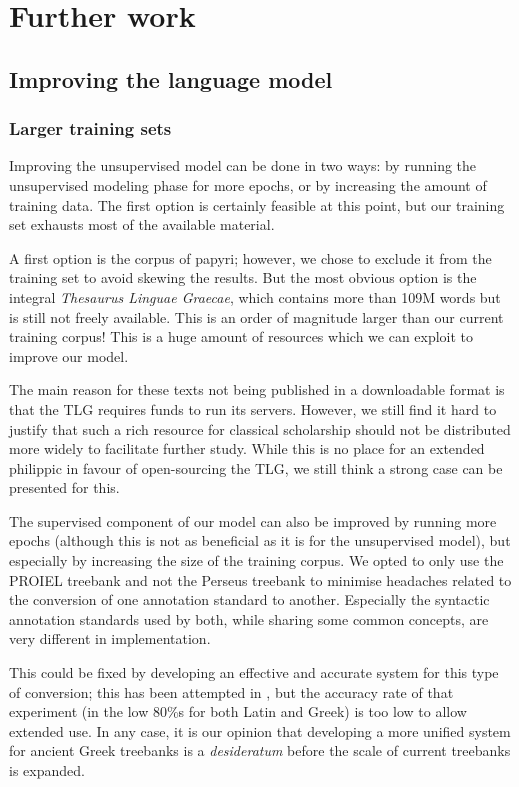 \section{Further work}
\label{sec:further_work}
\subsection{Improving the language model}
\subsubsection{Larger training sets}
Improving the unsupervised model can be done in two ways: by running
the unsupervised modeling phase for more epochs, or by increasing the
amount of training data. The first option is certainly feasible at
this point, but our training set exhausts most of the available
material. 

A first option is the corpus of papyri; however, we chose to exclude
it from the training set to avoid skewing the results. But the most
obvious option is the integral \textit{Thesaurus Linguae Graecae},
which contains more than 109M words but is still not freely
available. This is an order of magnitude larger than our current
training corpus! This is a huge amount of resources which we can
exploit to improve our model.

The main reason for these texts not being published in a downloadable
format is that the TLG requires funds to run its servers. However, we
still find it hard to justify that such a rich resource for classical
scholarship should not be distributed more widely to facilitate
further study. While this is no place for an extended philippic in
favour of open-sourcing the TLG, we still think a strong case can be
presented for this.

The supervised component of our model can also be improved by running
more epochs (although this is not as beneficial as it is for the
unsupervised model), but especially by increasing the size of the
training corpus. We opted to only use the PROIEL treebank and not the
Perseus treebank to minimise headaches related to the conversion of
one annotation standard to another. Especially the syntactic
annotation standards used by both, while sharing some common concepts,
are very different in implementation. 

This could be fixed by developing an effective and accurate system for
this type of conversion; this has been attempted in
\cite{conf/lrec/LeeH10}, but the accuracy rate of that experiment (in
the low 80\%s for both Latin and Greek) is too low to allow extended
use. In any case, it is our opinion that developing a more unified
system for ancient Greek treebanks is a \textit{desideratum} before
the scale of current treebanks is expanded.

